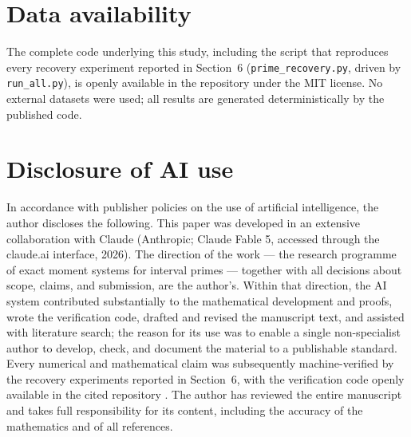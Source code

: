 \documentclass[11pt]{article}
\theoremstyle{remark}
\begin{document}
\section*{Data availability}

The complete code underlying this study, including the script that reproduces every recovery
experiment reported in Section~6 (\texttt{prime\_recovery.py}, driven by \texttt{run\_all.py}), is
openly available in the repository \cite{Code} under the MIT license. No external datasets were
used; all results are generated deterministically by the published code.

\section*{Disclosure of AI use}

In accordance with publisher policies on the use of artificial intelligence, the author discloses the
following. This paper was developed in an extensive collaboration with Claude (Anthropic; Claude Fable
5, accessed through the claude.ai interface, 2026). The direction of the work --- the research
programme of exact moment systems for interval primes --- together
with all decisions about scope, claims, and submission, are the author's. Within that direction, the
AI system contributed substantially to the mathematical development and proofs, wrote the verification
code, drafted and revised the manuscript text, and assisted with literature search; the reason for its
use was to enable a single non-specialist author to develop, check, and document the material to a
publishable standard. Every numerical and mathematical claim was subsequently machine-verified by
the recovery experiments reported in Section~6, with the verification code openly available in the cited repository \cite{Code}. The author has
reviewed the entire manuscript and takes full responsibility for its content, including the accuracy
of the mathematics and of all references.
\end{document}
